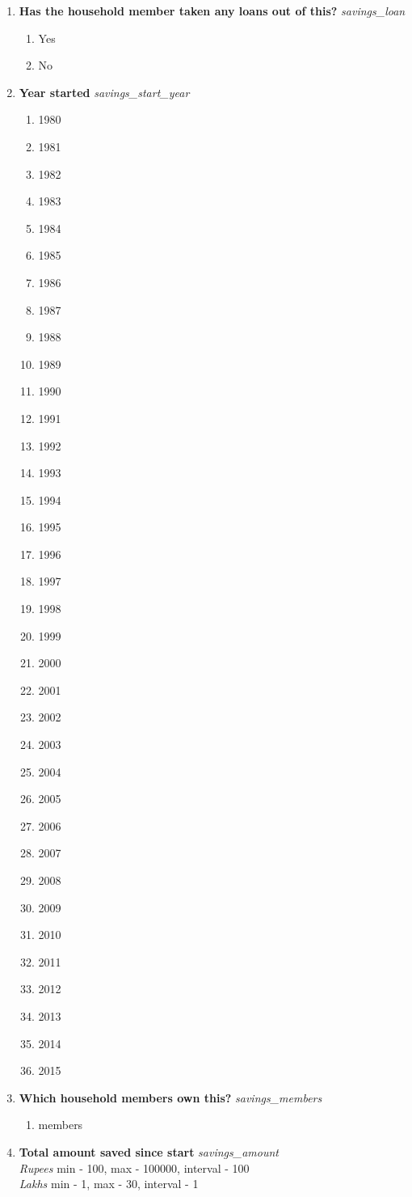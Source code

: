 \documentclass{article}
\begin{document}
\begin{enumerate}
\begin{enumerate}[label*=\arabic*.]
\item {\bfseries Has the household member taken any loans out of this?}\emph{ savings\_loan } 
\begin{enumerate} 
\item Yes 
\item No 
\end{enumerate} 
\item {\bfseries Year started}\emph{ savings\_start\_year } 
\begin{enumerate} 
\item 1980 
\item 1981 
\item 1982 
\item 1983 
\item 1984 
\item 1985 
\item 1986 
\item 1987 
\item 1988 
\item 1989 
\item 1990 
\item 1991 
\item 1992 
\item 1993 
\item 1994 
\item 1995 
\item 1996 
\item 1997 
\item 1998 
\item 1999 
\item 2000 
\item 2001 
\item 2002 
\item 2003 
\item 2004 
\item 2005 
\item 2006 
\item 2007 
\item 2008 
\item 2009 
\item 2010 
\item 2011 
\item 2012 
\item 2013 
\item 2014 
\item 2015 
\end{enumerate} 
\item {\bfseries Which household members own this?}\emph{ savings\_members } 
\begin{enumerate} 
\item members 
\end{enumerate} 
\item {\bfseries Total amount saved since start}\emph{ savings\_amount } 
\\ \emph{ Rupees }min - 100, max - 100000, interval - 100 
\\ \emph{ Lakhs }min - 1, max - 30, interval - 1 
 

\end{enumerate}
\end{enumerate}
\end{document}

